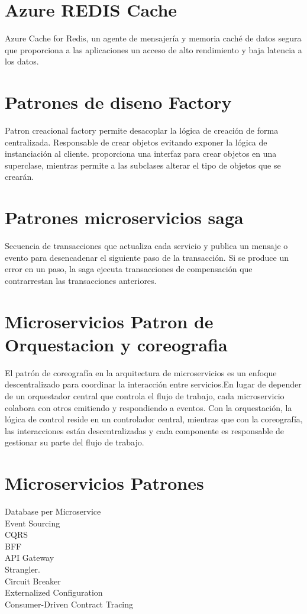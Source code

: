 \section{Azure REDIS Cache}
Azure Cache for Redis, un agente de mensajería y memoria caché de datos segura que proporciona a las aplicaciones un acceso de alto rendimiento y baja latencia a los datos. 
\section{Patrones de diseno Factory}
Patron creacional factory permite desacoplar la lógica de creación de forma centralizada. Responsable
de crear objetos evitando exponer la lógica de instanciación al cliente.
proporciona una interfaz para crear objetos en una superclase, mientras permite a las subclases alterar el tipo de objetos que se crearán.
\section{Patrones microservicios saga}
Secuencia de transacciones que actualiza cada servicio y publica un mensaje o evento para desencadenar
 el siguiente paso de la transacción. Si se produce un error en un paso, la saga ejecuta transacciones
  de compensación que contrarrestan las transacciones anteriores.
  \section{Microservicios Patron de Orquestacion y coreografia}
  El patrón de coreografía en la arquitectura de microservicios es un enfoque descentralizado para coordinar
   la interacción entre servicios.En lugar de depender de un orquestador central que controla el flujo de 
   trabajo, cada microservicio colabora con otros emitiendo y respondiendo a eventos.
  Con la orquestación, la lógica de control reside en un controlador central, mientras que con la coreografía, las interacciones están descentralizadas y cada componente es responsable de gestionar su parte del flujo de trabajo.
  \section{Microservicios Patrones}  
  Database per Microservice\\
  Event Sourcing\\
  CQRS\\
  BFF\\
  API Gateway\\
  Strangler.\\
  Circuit Breaker\\
  Externalized Configuration\\
  Consumer-Driven Contract Tracing\\

